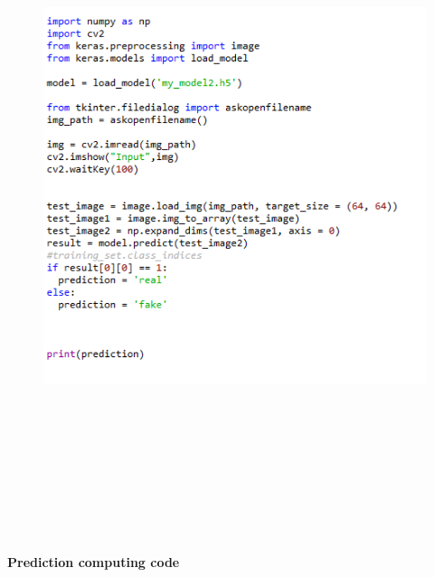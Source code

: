 \documentclass[a4paper,12pt,oneside]{article}
\begin{document}
\begin{figure}[H]
\centering
\includegraphics[height=20cm,width=15cm]{codetest.PNG}
\end{figure}
\newpage
\textbf{Prediction computing code}
\end{document}
